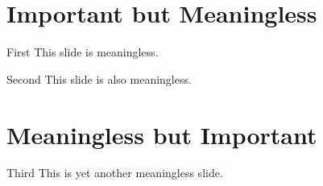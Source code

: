 \documentclass[17pt,dvipdfmx]{beamer} %
\begin{document}
\section{Important but Meaningless}
\begin{frame}{First}
This slide \pause is \alert{meaningless}.
\end{frame}
\begin{frame}{Second}
This slide \pause is also \alert{meaningless}.
\end{frame}

\section{Meaningless but Important}
\begin{frame}{Third}
This is yet another \alert{meaningless} slide.
\end{frame}
\end{document}
